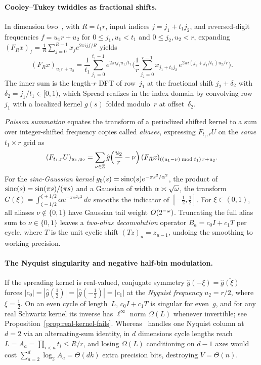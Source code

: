 \paragraph{Cooley--Tukey twiddles as fractional shifts.}
In dimension two~\cite{MS}, with $R=t_1 r$, input indices $j=j_1+t_1 j_2$, and reversed-digit frequencies $f=u_1 r+u_2$ for $0\le j_1,u_1<t_1$ and $0\le j_2,u_2<r$, expanding $(F_R x)_f = \frac1R\sum_{j=0}^{R-1} x_j e^{2\pi i j f/R}$ yields
\begin{equation}\label{eq:overview-ct}
  (F_R x)_{u_1 r + u_2}
  = \frac{1}{t_1}\sum_{j_1=0}^{t_1-1} e^{2\pi i j_1 u_1/t_1}
    \Biggl(\frac{1}{r}\sum_{j_2=0}^{r-1} x_{j_1+t_1 j_2}\,e^{2\pi i (j_2 + j_1/t_1) u_2/r}\Biggr).
\end{equation}
The inner sum is the length-$r$ DFT of row~$j_1$ at the fractional shift $j_2 + \delta_2$ with $\delta_2=j_1/t_1\in[0,1)$, which \textsf{Spread} realizes in the index domain by convolving row~$j_1$ with a localized kernel $g(s)$ folded modulo~$r$ at offset~$\delta_2$.

\emph{Poisson summation} equates the transform of a periodized shifted kernel to a sum over integer-shifted frequency copies called \emph{aliases}, expressing $F_{t_1,r}U$ on the \emph{same} $t_1\times r$ grid as
\[
  (F_{t_1,r}U)_{u_1,u_2} = \sum_{\nu\in\mathbb{Z}} \hat g\Bigl(\frac{u_2}{r}-\nu\Bigr)\,(F_R x)_{((u_1-\nu)\bmod t_1)\,r + u_2}.
\]
For the \emph{sinc-Gaussian kernel} $g_0(s)=\operatorname{sinc}(s)e^{-\pi s^2/\alpha^2}$, the product of $\operatorname{sinc}(s)=\sin(\pi s)/(\pi s)$ and a Gaussian of width $\alpha\asymp\sqrt{\omega}$, the transform $G(\xi)=\int_{\xi-1/2}^{\xi+1/2}\alpha e^{-\pi\alpha^2 v^2}\,dv$ smooths the indicator of $[-\frac12,\frac12]$. For $\xi\in(0,1)$, all aliases $\nu\notin\{0,1\}$ have Gaussian tail weight $O(2^{-\omega})$. Truncating the full alias sum to $\nu\in\{0,1\}$ leaves a \emph{two-alias deconvolution} operator $B_a = c_0 I + c_1 T$ per cycle, where $T$ is the unit cyclic shift $(Tz)_u = z_{u-1}$, undoing the smoothing to working precision.

\paragraph{The Nyquist singularity and negative half-bin modulation.}
If the spreading kernel is real-valued, conjugate symmetry $\hat g(-\xi)=\overline{\hat g(\xi)}$ forces $|c_0|=|\hat g(\frac12)|=|\hat g(-\frac12)|=|c_1|$ at the \emph{Nyquist frequency} $u_2=r/2$, where $\xi=\frac12$. On an even cycle of length~$L$, $c_0 I + c_1 T$ is singular for even~$g$, and for any real Schwartz kernel its inverse has $\ell^\infty$ norm $\Omega(L)$ whenever invertible; see Proposition~\ref{prop:real-kernel-fails}. Whereas~\cite{MS} handles one Nyquist column at $d=2$ via an alternating-sum identity, in $d$ dimensions cycle lengths reach $L=A_a=\prod_{i<a}t_i\le R/r$, and losing $\Omega(L)$ conditioning on $d-1$ axes would cost $\sum_{a=2}^d\log_2 A_a=\Theta(dk)$ extra precision bits, destroying $V=\Theta(n)$.

